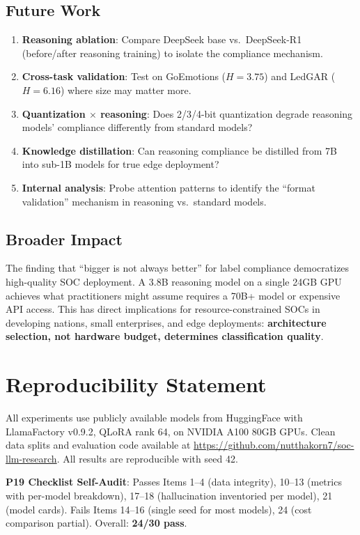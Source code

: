 \documentclass[review,3p]{elsarticle}
\begin{document}
\subsection{Future Work}
\begin{enumerate}
\item \textbf{Reasoning ablation}: Compare DeepSeek base vs.\ DeepSeek-R1 (before/after reasoning training) to isolate the compliance mechanism.
\item \textbf{Cross-task validation}: Test on GoEmotions ($H=3.75$) and LedGAR ($H=6.16$) where size may matter more.
\item \textbf{Quantization $\times$ reasoning}: Does 2/3/4-bit quantization degrade reasoning models' compliance differently from standard models?
\item \textbf{Knowledge distillation}: Can reasoning compliance be distilled from 7B into sub-1B models for true edge deployment?
\item \textbf{Internal analysis}: Probe attention patterns to identify the ``format validation'' mechanism in reasoning vs.\ standard models.
\end{enumerate}

\subsection{Broader Impact}
The finding that ``bigger is not always better'' for label compliance democratizes high-quality SOC deployment. A 3.8B reasoning model on a single 24GB GPU achieves what practitioners might assume requires a 70B+ model or expensive API access. This has direct implications for resource-constrained SOCs in developing nations, small enterprises, and edge deployments: \textbf{architecture selection, not hardware budget, determines classification quality}.

\section*{Reproducibility Statement}
All experiments use publicly available models from HuggingFace with LlamaFactory v0.9.2, QLoRA rank 64, on NVIDIA A100 80GB GPUs. Clean data splits and evaluation code available at \url{https://github.com/nutthakorn7/soc-llm-research}. All results are reproducible with seed 42.

\noindent\textbf{P19 Checklist Self-Audit}: Passes Items 1--4 (data integrity), 10--13 (metrics with per-model breakdown), 17--18 (hallucination inventoried per model), 21 (model cards). Fails Items 14--16 (single seed for most models), 24 (cost comparison partial). Overall: \textbf{24/30 pass}.
\end{document}

